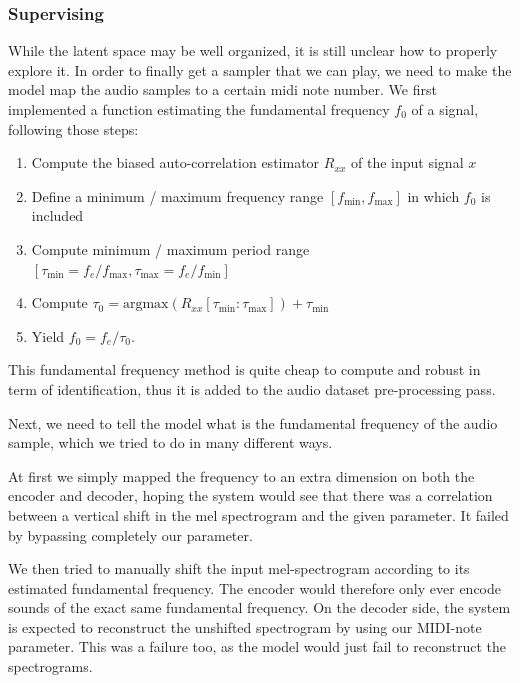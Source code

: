 \documentclass[11pt, english]{article}
\begin{document}
\subsubsection*{Supervising}

While the latent space may be well organized, it is still unclear how to properly explore it. In order to finally get a sampler that we can play, we need to make the model map the audio samples to a certain midi note number. We first implemented a function estimating the fundamental frequency $f_0$ of a signal, following those steps:

\begin {enumerate}[noitemsep]
    \item Compute the biased auto-correlation estimator $R_{xx}$ of the input signal $x$
    \item Define a minimum / maximum frequency range $[f_{\text{min}}, f_{\text{max}}]$ in which $f_0$ is included
    \item Compute minimum / maximum period range $[\tau_{\text{min}} = f_e / f_{\text{max}}, \tau_{\text{max}} = f_e / f_{\text{min}}]$
    \item Compute $\tau_0 = \text{argmax}(R_{xx}[\tau_{\text{min}}:\tau_{\text{max}}]) + \tau_{\text{min}}$
    \item Yield $f_0 = f_e / \tau_0$.
\end{enumerate}

This fundamental frequency method is quite cheap to compute and robust in term of identification, thus it is added to the audio dataset pre-processing pass.\newline

Next, we need to tell the model what is the fundamental frequency of the audio sample, which we tried to do in many different ways. 

At first we simply mapped the frequency to an extra dimension on both the encoder and decoder, hoping the system would see that there was a correlation between a vertical shift in the mel spectrogram and the given parameter. It failed by bypassing completely our parameter.

We then tried to manually shift the input mel-spectrogram according to its estimated fundamental frequency. The encoder would therefore only ever encode sounds of the exact same fundamental frequency. On the decoder side, the system is expected to reconstruct the unshifted spectrogram by using our MIDI-note parameter. This was a failure too, as the model would just fail to reconstruct the spectrograms.\newline
\end{document}

